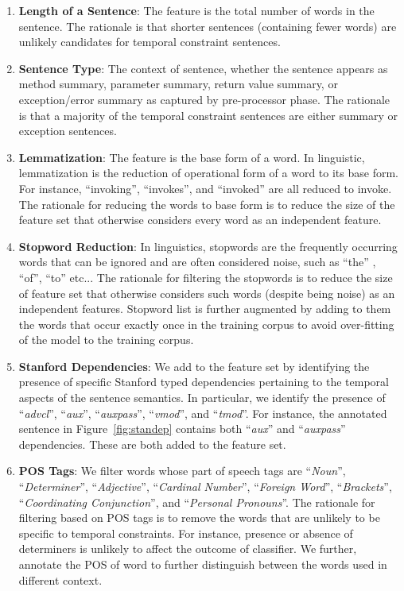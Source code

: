 \begin{enumerate}

	\item \textbf{Length of a Sentence}: The feature is the total number of words in  the sentence. The rationale is that shorter sentences (containing fewer words) are unlikely candidates for temporal constraint sentences. 

	\item \textbf{Sentence Type}: The context of sentence, whether the sentence appears as method summary, parameter summary, return value summary, or exception/error summary as captured by pre-processor phase. The rationale is that a majority of the temporal constraint sentences are either summary or exception sentences. 
	
	\item \textbf{Lemmatization}: The feature is the base form of a word. In linguistic, lemmatization is the reduction of operational form of a word to its base form. For instance, ``invoking'', ``invokes'', and ``invoked'' are all reduced to invoke. The rationale for reducing the words to base form is to reduce the size of the feature set that otherwise considers every word as an independent feature.  
	
	\item \textbf{Stopword Reduction}: In linguistics, stopwords are the frequently occurring words that can be ignored and are often considered noise, such as ``the'' , ``of'', ``to'' etc... The rationale for filtering the stopwords is to reduce the size of feature set that otherwise considers such words (despite being noise) as an independent features. Stopword list is further augmented by adding to them the words that occur exactly once in the training corpus to avoid over-fitting of the model to the training corpus.  
	
	\item \textbf{Stanford Dependencies}: We add to the feature set by identifying the presence of specific Stanford typed dependencies pertaining to the temporal aspects of the sentence semantics. In particular, we identify the presence of ``\textit{advcl}'', ``\textit{aux}'', ``\textit{auxpass}'', ``\textit{vmod}'', and ``\textit{tmod}''. For instance, the annotated sentence in Figure~\ref{fig:standep} contains both ``\textit{aux}'' and ``\textit{auxpass}'' dependencies. These are both added to the feature set.
	
	\item \textbf{POS Tags}: We filter words whose part of speech tags are ``\textit{Noun}'', ``\textit{Determiner}'', ``\textit{Adjective}'', ``\textit{Cardinal Number}'', ``\textit{Foreign Word}'', ``\textit{Brackets}'', ``\textit{Coordinating Conjunction}'', and ``\textit{Personal Pronouns}''. The rationale for filtering based on POS tags is to remove the words that are unlikely to be specific to temporal constraints. For instance, presence or absence of determiners is unlikely to affect the outcome of classifier. We further, annotate the POS of word to further distinguish between the words used in different context.       
		 
\end{enumerate}     


